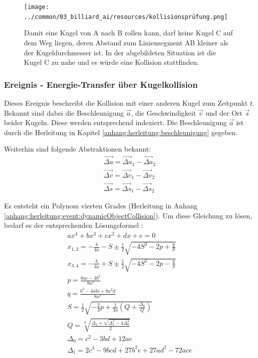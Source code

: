 \begin{figure}[h!]
    \begin{center}
        \texttt{[image: ../common/03\_billiard\_ai/resources/kollisionsprüfung.png]}
    \end{center}
    \caption{Damit eine Kugel von A nach B rollen kann, darf keine Kugel C auf dem Weg liegen,
        deren Abstand zum Liniensegment AB kleiner als der Kugeldurchmesser ist.
        In der abgebildeten Situation ist die Kugel C zu nahe und es würde eine Kollision stattfinden.
    }
    \label{fig:kollisionsprüfung}
\end{figure}

\subsubsection{Ereignis - Energie-Transfer über Kugelkollision}
Dieses Ereignis beschreibt die Kollision mit einer anderen Kugel zum Zeitpunkt $t$.
Bekannt sind dabei die Beschleunigung $\vec{a}$, die Geschwindigkeit $\vec{v}$ und der Ort $\vec{s}$ beider Kugeln.
Diese werden entsprechend indexiert.
Die Beschleunigung $\vec{a}$ ist durch die Herleitung in Kapitel \ref{anhang:herleitung:beschleunigung} gegeben.

Weiterhin sind folgende Abstraktionen bekannt:
\begin{align}
    \vec{\Delta a} = \vec{\Delta a}_1 - \vec{\Delta a}_2\\
    \vec{\Delta v} = \vec{\Delta v}_1 - \vec{\Delta v}_2\\
    \vec{\Delta s} = \vec{\Delta s}_1 - \vec{\Delta s}_2
\end{align}

Es entsteht ein Polynom vierten Grades (Herleitung in Anhang \ref{anhang:herleitung:event:dynamicObjectCollision}).
Um diese Gleichung zu lösen, bedarf es der entsprechenden Lösungsformel \cite{wiki.polynom:1}:
\begin{align}
    ax^4 + bx^3 + cx^2 + dx + e = 0\\
    x_{1,2} = -\frac{b}{4a} - S \pm \frac{1}{2}\sqrt{-4S^2 - 2p + \frac{q}{S}}\\
    x_{3,4} = -\frac{b}{4a} + S \pm \frac{1}{2}\sqrt{-4S^2 - 2p - \frac{q}{S}}\\
    p = \frac{8ac - 3b^2}{8a^2}\\
    q = \frac{b^3 - 4abc + 8a^{2}d}{8a^3}\\
    S = \frac{1}{2}\sqrt{-\frac{2}{3}p + \frac{1}{3a}(Q + \frac{\Delta_0}{Q})}\\
    Q = \sqrt[3]{\frac{\Delta_1 + \sqrt{\Delta_{1}^2 - 4\Delta_{0}^3}}{2}}\\
    \Delta_0 = c^2 - 3bd + 12ae\\
    \Delta_1 = 2c^3 - 9bcd + 27b^{2}e + 27ad^2 - 72ace
\end{align}

